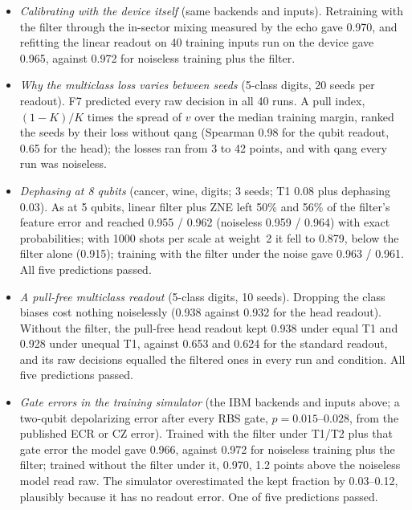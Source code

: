 \documentclass[11pt]{article}
\begin{document}
\begin{itemize}
  calibration it gave 0.968, and trained without the filter under it 0.968. Gate errors, which a T1/T2 calibration
  does not describe, dominate these noise models; the echo cut the decision error but changed no decision.
\item \textit{Calibrating with the device itself} (same backends and inputs). Retraining with the filter through the
  in-sector mixing measured by the echo gave 0.970, and refitting the linear readout on 40 training inputs run on the
  device gave 0.965, against 0.972 for noiseless training plus the filter.
\item \textit{Why the multiclass loss varies between seeds} (5-class digits, 20 seeds per readout). F7 predicted every
  raw decision in all 40 runs. A pull index, $(1-K)/K$ times the spread of $v$ over the median training margin,
  ranked the seeds by their loss without qang (Spearman 0.98 for the qubit readout, 0.65 for the head); the losses
  ran from 3 to 42 points, and with qang every run was noiseless.
\item \textit{Dephasing at 8 qubits} (cancer, wine, digits; 3 seeds; T1 0.08 plus dephasing 0.03). As at 5 qubits,
  linear filter plus ZNE left 50\% and 56\% of the filter's feature error and reached 0.955 / 0.962 (noiseless 0.959 /
  0.964) with exact probabilities; with 1000 shots per scale at weight~2 it fell to 0.879, below the filter alone
  (0.915); training with the filter under the noise gave 0.963 / 0.961. All five predictions passed.
\item \textit{A pull-free multiclass readout} (5-class digits, 10 seeds). Dropping the class biases cost nothing
  noiselessly (0.938 against 0.932 for the head readout). Without the filter, the pull-free head readout kept 0.938 under
  equal T1 and 0.928 under unequal T1, against 0.653 and 0.624 for the standard readout, and its raw decisions equalled
  the filtered ones in every run and condition. All five predictions passed.
\item \textit{Gate errors in the training simulator} (the IBM backends and inputs above; a two-qubit depolarizing
  error after every RBS gate, $p=0.015$--$0.028$, from the published ECR or CZ error). Trained with the filter under
  T1/T2 plus that gate error the model gave 0.966, against 0.972 for noiseless training plus the filter; trained
  without the filter under it, 0.970, 1.2 points above the noiseless model read raw. The simulator overestimated the
  kept fraction by 0.03--0.12, plausibly because it has no readout error. One of five predictions passed.
\end{itemize}
\end{document}
